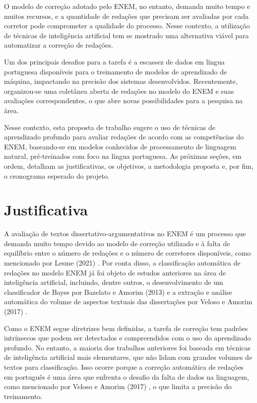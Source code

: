 \documentclass{article}
\begin{document}
O modelo de correção adotado pelo ENEM, no entanto, demanda muito tempo e muitos
recursos, e a quantidade de redações que precisam ser avaliadas por cada
corretor pode comprometer a qualidade do processo. Nesse contexto, a utilização
de técnicas de inteligência artificial tem se mostrado uma alternativa viável
para automatizar a correção de redações.

Um dos principais desafios para a tarefa é a escassez de dados em língua
portuguesa disponíveis para o treinamento de modelos de aprendizado de máquina,
impactando na precisão dos sistemas desenvolvidos. Recentemente, organizou-se
uma coletânea aberta de redações no modelo do ENEM e suas avaliações
correspondentes, o que abre novas possibilidades para a pesquisa na área.

Nesse contexto, esta proposta de trabalho sugere o uso de técnicas de
aprendizado profundo para avaliar redações de acordo com as competências do
ENEM, baseando-se em modelos conhecidos de processamento de linguagem natural,
pré-treinados com foco na língua portuguesa. As próximas seções, em ordem,
detalham as justificativas, os objetivos, a metodologia proposta e, por fim, o
cronograma esperado do projeto.

\section{Justificativa}
A avaliação de textos dissertativo-argumentativos no ENEM é um processo que
demanda muito tempo devido ao modelo de correção utilizado e à falta de
equilíbrio entre o número de redações e o número de corretores disponíveis, como
mencionado por Lesme (2021) \cite{Corretores}. Por conta disso, a classificação
automática de redações no modelo ENEM já foi objeto de estudos anteriores na
área de inteligência artificial, incluindo, dentre outros, o desenvolvimento de
um classificador de Bayes por Bazelato e Amorim (2013) \cite{Bayes} e a extração
e análise automática do volume de aspectos textuais das dissertações por Veloso
e Amorim (2017) \cite{Multi-Aspect}.

Como o ENEM segue diretrizes bem definidas, a tarefa de correção tem padrões
intrínsecos que podem ser detectados e compreendidos com o uso do aprendizado
profundo. No entanto, a maioria dos trabalhos anteriores foi baseada em técnicas
de inteligência artificial mais elementares, que não lidam com grandes volumes
de textos para classificação. Isso ocorre porque a correção automática de
redações em português é uma área que enfrenta o desafio da falta de dados na
linguagem, como mencionado por Veloso e Amorim (2017) \cite{Multi-Aspect}, o que
limita a precisão do treinamento.
\end{document}
